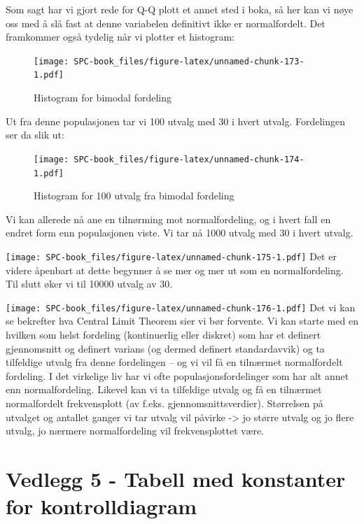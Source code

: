 \documentclass[
]{book}
\begin{document}
Som sagt har vi gjort rede for Q-Q plott et annet sted i boka, så her kan vi nøye oss med å slå fast at denne variabelen definitivt ikke er normalfordelt.
Det framkommer også tydelig når vi plotter et histogram:

\begin{figure}
\centering
\texttt{[image: SPC-book\_files/figure-latex/unnamed-chunk-173-1.pdf]}
\caption{\label{fig:unnamed-chunk-173}Histogram for bimodal fordeling}
\end{figure}

Ut fra denne populasjonen tar vi 100 utvalg med 30 i hvert utvalg. Fordelingen ser da slik ut:

\begin{figure}
\centering
\texttt{[image: SPC-book\_files/figure-latex/unnamed-chunk-174-1.pdf]}
\caption{\label{fig:unnamed-chunk-174}Histogram for 100 utvalg fra bimodal fordeling}
\end{figure}

Vi kan allerede nå ane en tilnørming mot normalfordeling, og i hvert fall en endret form enn populasjonen viste. Vi tar nå 1000 utvalg med 30 i hvert utvalg.

\texttt{[image: SPC-book\_files/figure-latex/unnamed-chunk-175-1.pdf]}
Det er videre åpenbart at dette begynner å se mer og mer ut som en normalfordeling. Til slutt øker vi til 10000 utvalg av 30.

\texttt{[image: SPC-book\_files/figure-latex/unnamed-chunk-176-1.pdf]}
Det vi kan se bekrefter hva Central Limit Theorem sier vi bør forvente. Vi kan starte med en hvilken som helst fordeling (kontinuerlig eller diskret) som har et definert gjennomsnitt og definert varians (og dermed definert standardavvik) og ta tilfeldige utvalg fra denne fordelingen -- og vi vil få en tilnærmet normalfordelt fordeling. I det virkelige liv har vi ofte populasjonsfordelinger som har alt annet enn normalfordeling. Likevel kan vi ta tilfeldige utvalg og få en tilnærmet normalfordelt frekvensplott (av f.eks. gjennomsnittsverdier). Størrelsen på utvalget og antallet ganger vi tar utvalg vil påvirke -\textgreater{} jo større utvalg og jo flere utvalg, jo nærmere normalfordeling vil frekvensplottet være.

\hypertarget{vedlegg-5---tabell-med-konstanter-for-kontrolldiagram}{%
\chapter*{Vedlegg 5 - Tabell med konstanter for kontrolldiagram}\label{vedlegg-5---tabell-med-konstanter-for-kontrolldiagram}}
\end{document}
